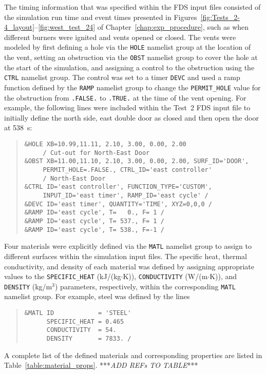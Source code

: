 The timing information that was specified within the FDS input files consisted of the simulation run time and event times presented in Figures~\ref{fig:Tests_2-4_layout}--\ref{fig:west_test_24} of Chapter~\ref{chap:exp_procedure}, such as when different burners were ignited and vents opened or closed. The vents were modeled by first defining a hole via the \verb|HOLE| namelist group at the location of the vent, setting an obstruction via the \verb|OBST| namelist group to cover the hole at the start of the simulation, and assigning a control to the obstruction using the \verb|CTRL| namelist group. The control was set to a timer \verb|DEVC| and used a ramp function defined by the \verb|RAMP| namelist group to change the \verb|PERMIT_HOLE| value for the obstruction from \verb|.FALSE.| to \verb|.TRUE.| at the time of the vent opening. For example, the following lines were included within the Test~2 FDS input file to initially define the north side, east double door as closed and then open the door at 538~s:
\begin{quote}
\begin{verbatim}
&HOLE XB=10.99,11.11, 2.10, 3.00, 0.00, 2.00 
     / Cut-out for North-East Door
&OBST XB=11.00,11.10, 2.10, 3.00, 0.00, 2.00, SURF_ID='DOOR', 
     PERMIT_HOLE=.FALSE., CTRL_ID='east controller' 
     / North-East Door
&CTRL ID='east controller', FUNCTION_TYPE='CUSTOM', 
     INPUT_ID='east timer', RAMP_ID='east cycle' /
&DEVC ID='east timer', QUANTITY='TIME', XYZ=0,0,0 /
&RAMP ID='east cycle', T=   0., F= 1 /
&RAMP ID='east cycle', T= 537., F= 1 /
&RAMP ID='east cycle', T= 538., F=-1 /
\end{verbatim}
\end{quote}

Four materials were explicitly defined via the \verb|MATL| namelist group to assign to different surfaces within the simulation input files. The specific heat, thermal conductivity, and density of each material was defined by assigning appropriate values to the \verb|SPECIFIC_HEAT| (kJ/(kg$\cdot$K)), \verb|CONDUCTIVITY| (W/(m$\cdot$K)), and \verb|DENSITY| (kg/m$^3$) parameters, respectively, within the corresponding \verb|MATL| namelist group. For example, steel was defined by the lines
\begin{quote}
\begin{verbatim}
&MATL ID            = 'STEEL'
      SPECIFIC_HEAT = 0.465
      CONDUCTIVITY  = 54.
      DENSITY       = 7833. /
\end{verbatim}
\end{quote}
A complete list of the defined materials and corresponding properties are listed in Table~\ref{table:material_props}. ***\textit{ADD REFs TO TABLE}***

